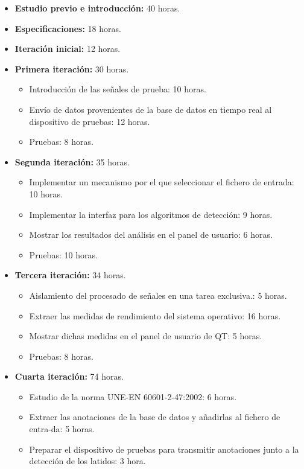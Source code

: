 \begin{itemize}
    \item \textbf{Estudio previo e introducción:} 40 horas.
    \item \textbf{Especificaciones:} 18 horas.
    \item \textbf{Iteración inicial:} 12 horas.
    \item \textbf{Primera iteración:} 30 horas.
    \begin{itemize}
        \item Introducción de las señales de prueba: 10 horas.
        \item Envío de datos provenientes de la base de datos en tiempo real al dispositivo de pruebas: 12 horas. 
        \item Pruebas: 8 horas.
    \end{itemize}
    \item \textbf{Segunda iteración:} 35 horas.
    \begin{itemize}
        \item Implementar un mecanismo por el que seleccionar el fichero de entrada: 10 horas.
        \item Implementar la interfaz para los algoritmos de detección: 9 horas. 
        \item Mostrar los resultados del análisis en el panel de usuario: 6 horas.
        \item Pruebas: 10 horas.
    \end{itemize}
    \item \textbf{Tercera iteración:} 34 horas.
    \begin{itemize}
        \item Aislamiento del procesado de señales en una tarea exclusiva.: 5 horas.
        \item Extraer las medidas de rendimiento del sistema operativo: 16 horas. 
        \item Mostrar dichas medidas en el panel de usuario de QT: 5 horas.
        \item Pruebas: 8 horas.
    \end{itemize}
    \item \textbf{Cuarta iteración:} 74 horas.
    \begin{itemize}
        \item Estudio de la norma UNE-EN 60601-2-47:2002: 6 horas.
        \item Extraer las anotaciones de la base de datos y añadirlas al fichero de entra-da: 5 horas. 
        \item Preparar el dispositivo de pruebas para transmitir anotaciones junto a la detección de los latidos: 3 hora.

\end{itemize}
\end{itemize}
